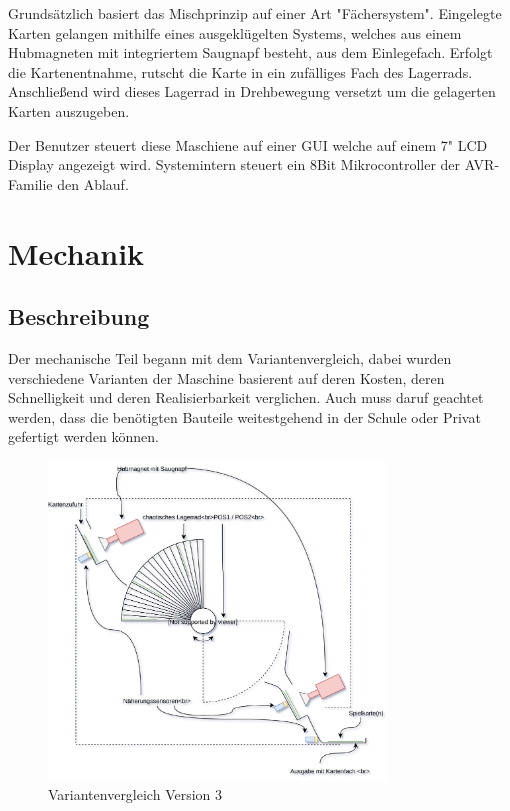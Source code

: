 Grundsätzlich basiert das Mischprinzip auf einer Art "Fächersystem".
Eingelegte Karten gelangen mithilfe eines ausgeklügelten Systems, welches aus einem Hubmagneten mit integriertem Saugnapf besteht, aus dem Einlegefach.
Erfolgt die Kartenentnahme, rutscht die Karte in ein zufälliges Fach des Lagerrads. Anschließend wird dieses Lagerrad in Drehbewegung versetzt um die gelagerten Karten auszugeben.

Der Benutzer steuert diese Maschiene auf einer GUI welche auf einem 7" LCD Display angezeigt wird. Systemintern steuert ein 8Bit Mikrocontroller der AVR-Familie den Ablauf.

\chapter{Mechanik}
\label{sec:Mechanik}
\section{Beschreibung}

Der mechanische Teil begann mit dem Variantenvergleich, dabei wurden verschiedene Varianten der Maschine basierent auf deren Kosten, deren Schnelligkeit und deren Realisierbarkeit verglichen.
Auch muss daruf geachtet werden, dass die benötigten Bauteile weitestgehend in der Schule oder Privat gefertigt werden können.
\begin{figure}[H]
    \vspace{-30pt}
    \includegraphics[width=0.80\textwidth]{fig/Reshuffled_Version_3_0_prinzip.pdf}
    \caption{Variantenvergleich Version 3}
    \label{Variantenvergleich}
\end{figure}

